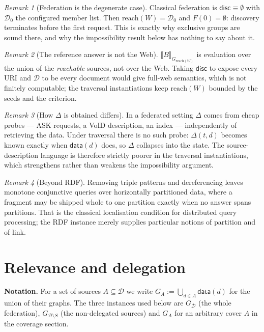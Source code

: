 \documentclass[11pt,a4paper]{article}
\theoremstyle{definition}
\theoremstyle{plain}
\theoremstyle{remark}
\newtheorem*{remark}{Remark}
\newcommand{\Dd}{\mathcal{D}}
\newcommand{\dataf}{\mathsf{data}}
\newcommand{\disc}{\mathsf{disc}}
\newcommand{\reach}{\mathrm{reach}}
\newcommand{\ev}[2]{\llbracket #1 \rrbracket_{#2}}
\begin{document}
\begin{remark}[Federation is the degenerate case]
Classical federation is $\disc \equiv \emptyset$ with $\Dd_0$ the configured member
list. Then $\reach(W) = \Dd_0$ and $F(0) = \emptyset$: discovery terminates
before the first request. This is exactly why exclusive groups are sound there, and why
the impossibility result below has nothing to say about it.
\end{remark}

\begin{remark}[The reference answer is not the Web]
$\ev{B}{G_{\reach(W)}}$ is evaluation over the union of the \emph{reachable}
sources, not over the Web. Taking $\disc$ to expose every URI and $\Dd$ to be every
document would give full-web semantics, which is not finitely computable; the traversal
instantiations keep $\reach(W)$ bounded by the seeds and the criterion.
\end{remark}

\begin{remark}[How $\Delta$ is obtained differs]
In a federated setting $\Delta$ comes from cheap probes --- \textsf{ASK} requests, a VoID
description, an index --- independently of retrieving the data. Under traversal there is
no such probe: $\Delta(t,d)$ becomes known exactly when $\dataf(d)$ does, so $\Delta$
collapses into the state. The source-description language is therefore strictly poorer in
the traversal instantiations, which strengthens rather than weakens the impossibility
argument.
\end{remark}

\begin{remark}[Beyond RDF]
Removing triple patterns and dereferencing leaves monotone conjunctive queries over
horizontally partitioned data, where a fragment may be shipped whole to one partition
exactly when no answer spans partitions. That is the classical localisation condition for
distributed query processing; the RDF instance merely supplies particular notions of
partition and of link.
\end{remark}

\section{Relevance and delegation}

\noindent
\textbf{Notation.} For a set of sources $A \subseteq \Dd$ we write
$G_A := \bigcup_{d \in A} \dataf(d)$ for the union of their graphs. The three instances
used below are $G_{\Dd}$ (the whole federation), $G_{\Dd \setminus S}$ (the
non-delegated sources) and $G_A$ for an arbitrary cover $A$ in the coverage section.
\end{document}
